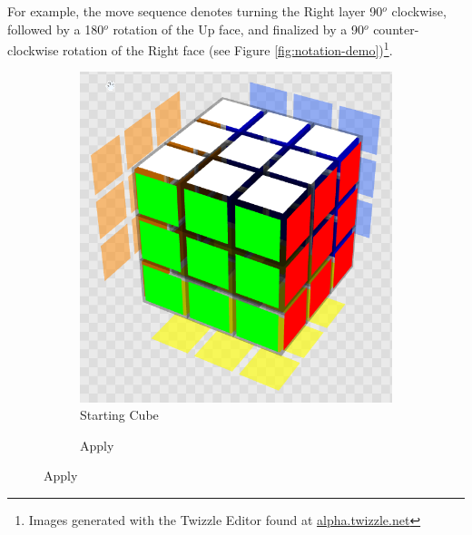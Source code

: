 For example, the move sequence  denotes turning the Right
layer 90$^o$ clockwise, followed by a 180$^o$ rotation of the Up face,
and finalized by a 90$^o$ counter-clockwise rotation of the Right face
(see Figure \ref{fig:notation-demo})\footnote{Images generated with the
Twizzle Editor found at
\href{https://alpha.twizzle.net/edit/?alg=R+U2+R\%27}{alpha.twizzle.net}}.

\begin{figure}[h]
    \centering
    \caption{The move sequence }
    \label{fig:notation-demo}
    \begin{subfigure}{0.25\textwidth}
        \centering
        \caption{Starting Cube}
        \label{fig:notation-demo-start}
        \includegraphics[width=.90\linewidth]{Figures/2 Background/start.png}
    \end{subfigure}%
    \begin{subfigure}{0.25\textwidth}
        \centering
        \caption{Apply }
        \label{fig:notation-demo-r}

\end{subfigure}
\end{figure}

